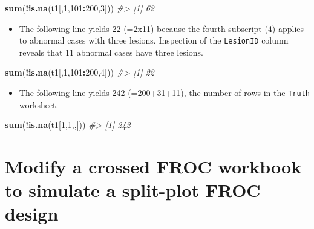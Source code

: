 \documentclass[]{book}
\newenvironment{Shaded}{\begin{snugshade}}{\end{snugshade}}
\newcommand{\CommentTok}[1]{\textcolor[rgb]{0.56,0.35,0.01}{\textit{#1}}}
\newcommand{\DecValTok}[1]{\textcolor[rgb]{0.00,0.00,0.81}{#1}}
\newcommand{\KeywordTok}[1]{\textcolor[rgb]{0.13,0.29,0.53}{\textbf{#1}}}
\newcommand{\NormalTok}[1]{#1}
\newcommand{\OperatorTok}[1]{\textcolor[rgb]{0.81,0.36,0.00}{\textbf{#1}}}
\providecommand{\tightlist}{%
  \setlength{\itemsep}{0pt}\setlength{\parskip}{0pt}}
\begin{document}
\begin{Shaded}
\begin{Highlighting}[]
\KeywordTok{sum}\NormalTok{(}\OperatorTok{!}\KeywordTok{is.na}\NormalTok{(t1[,}\DecValTok{1}\NormalTok{,}\DecValTok{101}\OperatorTok{:}\DecValTok{200}\NormalTok{,}\DecValTok{3}\NormalTok{]))}
\CommentTok{#> [1] 62}
\end{Highlighting}
\end{Shaded}

\begin{itemize}
\tightlist
\item
  The following line yields 22 (=2x11) because the fourth subscript (4) applies to abnormal cases with three lesions. Inspection of the \texttt{LesionID} column reveals that 11 abnormal cases have three lesions.
\end{itemize}

\begin{Shaded}
\begin{Highlighting}[]
\KeywordTok{sum}\NormalTok{(}\OperatorTok{!}\KeywordTok{is.na}\NormalTok{(t1[,}\DecValTok{1}\NormalTok{,}\DecValTok{101}\OperatorTok{:}\DecValTok{200}\NormalTok{,}\DecValTok{4}\NormalTok{]))}
\CommentTok{#> [1] 22}
\end{Highlighting}
\end{Shaded}

\begin{itemize}
\tightlist
\item
  The following line yields 242 (=200+31+11), the number of rows in the \texttt{Truth} worksheet.
\end{itemize}

\begin{Shaded}
\begin{Highlighting}[]
\KeywordTok{sum}\NormalTok{(}\OperatorTok{!}\KeywordTok{is.na}\NormalTok{(t1[}\DecValTok{1}\NormalTok{,}\DecValTok{1}\NormalTok{,,]))}
\CommentTok{#> [1] 242}
\end{Highlighting}
\end{Shaded}

\hypertarget{modify-a-crossed-froc-workbook-to-simulate-a-split-plot-froc-design}{%
\section{Modify a crossed FROC workbook to simulate a split-plot FROC design}\label{modify-a-crossed-froc-workbook-to-simulate-a-split-plot-froc-design}}
\end{document}
